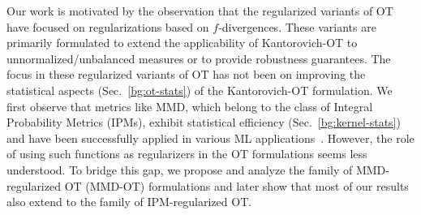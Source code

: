 Our work is motivated by the observation that the regularized variants of OT have focused on regularizations based on $f$-divergences. These variants are primarily formulated to extend the applicability of Kantorovich-OT to unnormalized/unbalanced measures or to provide robustness guarantees. The focus in these regularized variants of OT has not been on improving the statistical aspects (Sec.~\ref{bg:ot-stats}) of the Kantorovich-OT formulation. We first observe that metrics like MMD, which belong to the class of Integral Probability Metrics (IPMs), exhibit statistical efficiency (Sec.~\ref{bg:kernel-stats}) and have been successfully applied in various ML applications~\citep {gretton12a,Li17,Li21,nguyen20}. However, the role of using such functions as regularizers in the OT formulations seems less understood. To bridge this gap, we propose and analyze the family of MMD-regularized OT (MMD-OT) formulations and later show that most of our results also extend to the family of IPM-regularized OT.



